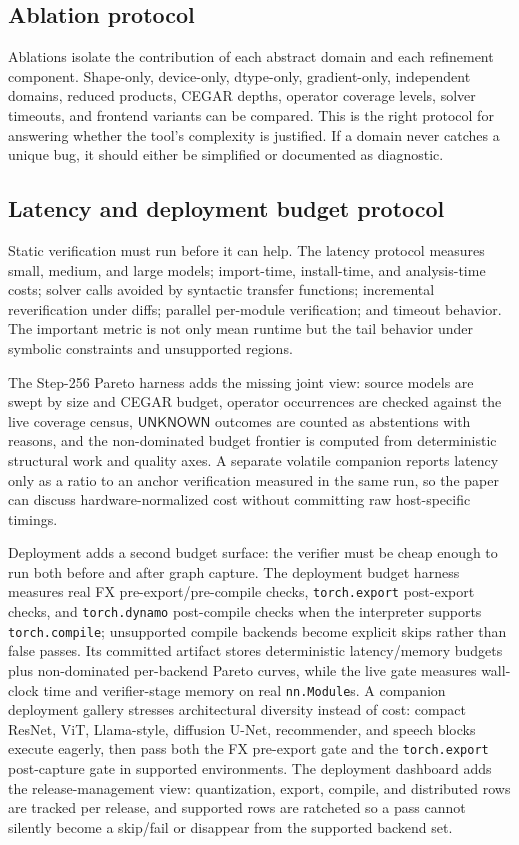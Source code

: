 \documentclass[11pt]{article}
\newcommand{\unknown}{\ensuremath{\mathsf{UNKNOWN}}}
\begin{document}
\subsection{Ablation protocol}

Ablations isolate the contribution of each abstract domain and each refinement
component.  Shape-only, device-only, dtype-only, gradient-only, independent
domains, reduced products, CEGAR depths, operator coverage levels, solver
timeouts, and frontend variants can be compared.  This is the right protocol
for answering whether the tool's complexity is justified.  If a domain never
catches a unique bug, it should either be simplified or documented as diagnostic.

\subsection{Latency and deployment budget protocol}

Static verification must run before it can help.  The latency protocol measures
small, medium, and large models; import-time, install-time, and analysis-time
costs; solver calls avoided by syntactic transfer functions; incremental
reverification under diffs; parallel per-module verification; and timeout
behavior.  The important metric is not only mean runtime but the tail behavior
under symbolic constraints and unsupported regions.

The Step-256 Pareto harness adds the missing joint view: source models are swept
by size and CEGAR budget, operator occurrences are checked against the live
coverage census, \unknown{} outcomes are counted as abstentions with reasons, and
the non-dominated budget frontier is computed from deterministic structural work
and quality axes.  A separate volatile companion reports latency only as a ratio
to an anchor verification measured in the same run, so the paper can discuss
hardware-normalized cost without committing raw host-specific timings.

Deployment adds a second budget surface: the verifier must be cheap enough to
run both before and after graph capture.  The deployment budget harness measures
real FX pre-export/pre-compile checks, \texttt{torch.export} post-export checks,
and \texttt{torch.dynamo} post-compile checks when the interpreter supports
\texttt{torch.compile}; unsupported compile backends become explicit skips
rather than false passes.  Its committed artifact stores deterministic
latency/memory budgets plus non-dominated per-backend Pareto curves, while the
live gate measures wall-clock time and verifier-stage memory on real
\texttt{nn.Module}s.  A companion deployment gallery stresses architectural
diversity instead of cost: compact ResNet, ViT, Llama-style, diffusion U-Net,
recommender, and speech blocks execute eagerly, then pass both the FX pre-export
gate and the \texttt{torch.export} post-capture gate in supported environments.
The deployment dashboard adds the release-management view: quantization, export,
compile, and distributed rows are tracked per release, and supported rows are
ratcheted so a pass cannot silently become a skip/fail or disappear from the
supported backend set.
\end{document}
